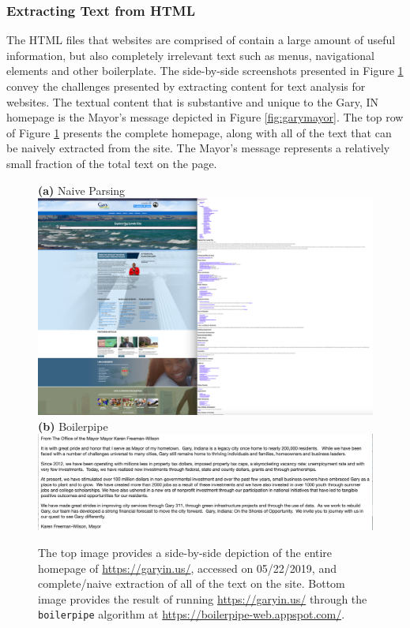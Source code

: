 \documentclass[11pt]{article}
\begin{document}
\subsubsection{Extracting Text from HTML}
The HTML files that websites are comprised of contain a large amount of useful information, but also completely irrelevant text such as menus, navigational elements and other boilerplate. The side-by-side screenshots presented in Figure \ref{fig:garysbs} convey the challenges presented by extracting content for text analysis for websites. The textual content that is substantive and unique to the Gary, IN homepage is the Mayor's message depicted in Figure \ref{fig:garymayor}. The top row of Figure \ref{fig:garysbs} presents the complete homepage, along with all of the text that can be naively extracted from the site. The Mayor's message represents a relatively small fraction of the total text on the page.


\begin{figure}
\centering
{\bf (a)} Naive Parsing  \\ \vspace{.2cm} 
\includegraphics[scale=0.35]{figures/gary_sidebyside} \\ \vspace{.4cm}
{\bf (b)} Boilerpipe 
\includegraphics[scale=0.375]{figures/gary_bp}

\caption{The top image provides a side-by-side depiction of the entire homepage of \url{https://garyin.us/}, accessed on 05/22/2019, and complete/naive extraction of all of the text on the site. Bottom image provides the result of running \url{https://garyin.us/} through the \texttt{boilerpipe} algorithm at \url{https://boilerpipe-web.appspot.com/}.}
\label{fig:garysbs}
\end{figure}
\end{document}

